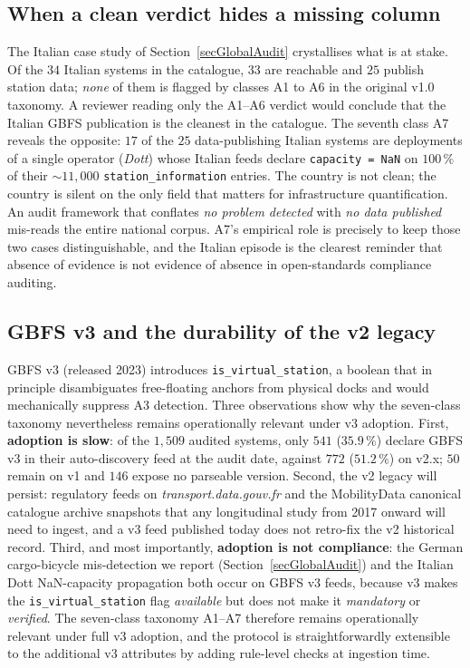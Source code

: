 \documentclass[11pt,a4paper]{article}
\begin{document}
\subsection{When a clean verdict hides a missing column}
The Italian case study of Section~\ref{secGlobalAudit} crystallises
what is at stake. Of the $34$ Italian systems in the catalogue, $33$
are reachable and $25$ publish station data; \emph{none} of them is
flagged by classes A1 to A6 in the original v1.0 taxonomy. A reviewer
reading only the A1--A6 verdict would conclude that the Italian GBFS
publication is the cleanest in the catalogue. The seventh class A7
reveals the opposite: $17$ of the $25$ data-publishing Italian systems
are deployments of a single operator (\emph{Dott}) whose Italian
feeds declare \texttt{capacity = NaN} on $100\,\%$ of their
$\sim 11{,}000$ \texttt{station\_information} entries. The country is
not clean; the country is silent on the only field that matters for
infrastructure quantification. An audit framework that conflates
\emph{no problem detected} with \emph{no data published} mis-reads
the entire national corpus. A7's empirical role is precisely to keep
those two cases distinguishable, and the Italian episode is the
clearest reminder that absence of evidence is not evidence of absence
in open-standards compliance auditing.

\subsection{GBFS v3 and the durability of the v2 legacy}
GBFS v3 (released 2023) introduces \texttt{is\_virtual\_station},
a boolean that in principle disambiguates free-floating anchors
from physical docks and would mechanically suppress A3 detection.
Three observations show why the seven-class taxonomy nevertheless
remains operationally relevant under v3 adoption. First, \textbf{adoption is
slow}: of the $1{,}509$ audited systems, only $541$ ($35.9\,\%$)
declare GBFS v3 in their auto-discovery feed at the audit date,
against $772$ ($51.2\,\%$) on v2.x; $50$ remain on v1 and $146$
expose no parseable version. Second, the v2 legacy will persist:
regulatory feeds on \emph{transport.data.gouv.fr} and the
MobilityData canonical catalogue archive snapshots that any
longitudinal study from 2017 onward will need to ingest, and a v3
feed published today does not retro-fix the v2 historical record.
Third, and most importantly, \textbf{adoption is not compliance}:
the German cargo-bicycle mis-detection we report
(Section~\ref{secGlobalAudit}) and the Italian Dott NaN-capacity
propagation both occur on GBFS v3 feeds, because v3 makes the
\texttt{is\_virtual\_station} flag \emph{available} but does not
make it \emph{mandatory} or \emph{verified}. The seven-class
taxonomy A1--A7 therefore remains operationally relevant under
full v3 adoption, and the protocol is straightforwardly extensible
to the additional v3 attributes by adding rule-level checks at
ingestion time.
\end{document}
